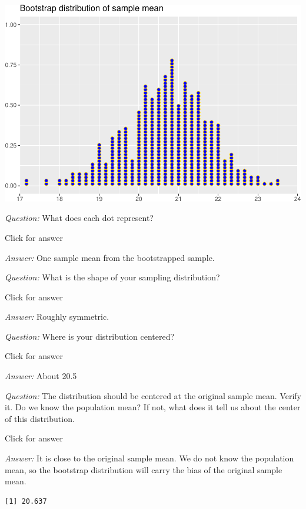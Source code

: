 \documentclass[
]{book}
\newenvironment{Shaded}{\begin{snugshade}}{\end{snugshade}}
\newcommand{\CommentTok}[1]{\textcolor[rgb]{0.56,0.35,0.01}{\textit{#1}}}
\newcommand{\FunctionTok}[1]{\textcolor[rgb]{0.00,0.00,0.00}{#1}}
\newcommand{\NormalTok}[1]{#1}
\newcommand{\SpecialCharTok}[1]{\textcolor[rgb]{0.00,0.00,0.00}{#1}}
\begin{document}
\includegraphics[width=1\linewidth]{Class_Activity_7_files/figure-latex/unnamed-chunk-4-1}

\emph{Question:} What does each dot represent?

Click for answer

\emph{Answer:} One sample mean from the bootstrapped sample.

\emph{Question:} What is the shape of your sampling distribution?

Click for answer

\emph{Answer:} Roughly symmetric.

\emph{Question:} Where is your distribution centered?

Click for answer

\emph{Answer:} About 20.5

\emph{Question:} The distribution should be centered at the original sample mean. Verify it. Do we know the population mean? If not, what does it tell us about the center of this distribution.

Click for answer

\emph{Answer:} It is close to the original sample mean. We do not know the population mean, so the bootstrap distribution will carry the bias of the original sample mean.

\begin{Shaded}
\end{Shaded}

\begin{verbatim}
[1] 20.637
\end{verbatim}
\end{document}
